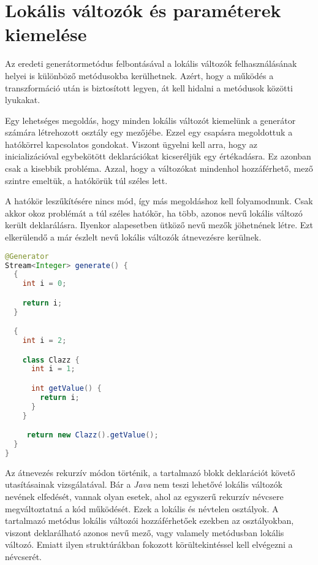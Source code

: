\section{Lokális változók és paraméterek kiemelése}

Az eredeti generátormetódus felbontásával a lokális változók felhasználásának helyei is különböző metódusokba kerülhetnek. Azért, hogy a működés a transzformáció után is biztosított legyen, át kell hidalni a metódusok közötti lyukakat. 

Egy lehetséges megoldás, hogy minden lokális változót kiemelünk a generátor számára létrehozott osztály egy mezőjébe. Ezzel egy csapásra megoldottuk a hatókörrel kapcsolatos gondokat. Viszont ügyelni kell arra, hogy az inicializációval egybekötött deklarációkat kicseréljük egy értékadásra. Ez azonban csak a kisebbik probléma. Azzal, hogy a változókat mindenhol hozzáférhető, mező szintre emeltük, a hatókörük túl széles lett.

A hatókör leszűkítésére nincs mód, így más megoldáshoz kell folyamodnunk. Csak akkor okoz problémát a túl széles hatókör, ha több, azonos nevű lokális változó került deklarálásra. Ilyenkor alapesetben ütköző nevű mezők jöhetnének létre. Ezt elkerülendő a már észlelt nevű lokális változók átnevezésre kerülnek.

\begin{lstlisting}[language=Java, caption={Elfedő deklarációkat tartalmazó generátor}, captionpos=b, label=GenShadowing, escapechar=$]
@Generator
Stream<Integer> generate() {
  {
    int i = 0;

    return i;
  }

  {
    int i = 2;

    class Clazz {
      int i = 1;

      int getValue() {
        return i;
      }
    }

     return new Clazz().getValue();
  }
}
\end{lstlisting}

Az átnevezés rekurzív módon történik, a tartalmazó blokk deklarációt követő utasításainak vizsgálatával. Bár a \textit{Java} nem teszi lehetővé lokális változók nevének elfedését, vannak olyan esetek, ahol az egyszerű rekurzív névcsere megváltoztatná a kód működését. Ezek a lokális és névtelen osztályok. A tartalmazó metódus lokális változói hozzáférhetőek ezekben az osztályokban, viszont deklarálható azonos nevű mező, vagy valamely metódusban lokális változó. Emiatt ilyen struktúrákban fokozott körültekintéssel kell elvégezni a névcserét.

